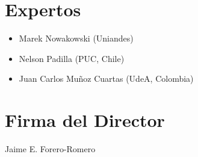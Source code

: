 \documentclass[12pt]{article}
\begin{document}
\section{Expertos}

\begin{itemize}
	\item Marek Nowakowski (Uniandes)
	\item Nelson Padilla (PUC, Chile)
	\item Juan Carlos Mu\~noz Cuartas (UdeA, Colombia)
\end{itemize}


%


\section*{Firma del Director}
\vspace{2.5cm}

Jaime E. Forero-Romero
\end{document}
